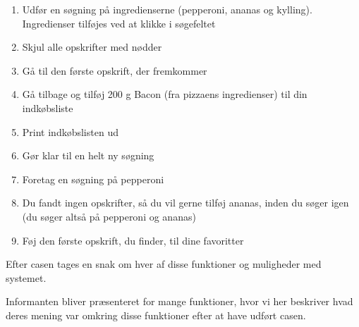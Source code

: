 \begin{description}
\begin{enumerate}[noitemsep]
\item Udfør en søgning på ingredienserne (pepperoni, ananas og kylling). Ingredienser tilføjes ved at klikke i søgefeltet
\item Skjul alle opskrifter med nødder
\item Gå til den første opskrift, der fremkommer
\item Gå tilbage og tilføj 200 g Bacon (fra pizzaens ingredienser) til din indkøbsliste
\item Print indkøbslisten ud
\item Gør klar til en helt ny søgning
\item Foretag en søgning på pepperoni
\item Du fandt ingen opskrifter, så du vil gerne tilføj ananas, inden du søger igen (du søger altså på pepperoni og ananas)
\item Føj den første opskrift, du finder, til dine favoritter
\end{enumerate}

Efter casen tages en snak om hver af disse funktioner og muligheder med systemet.

Informanten bliver præsenteret for mange funktioner, hvor vi her beskriver hvad deres mening var omkring disse funktioner efter at have udført casen.


\end{description}
